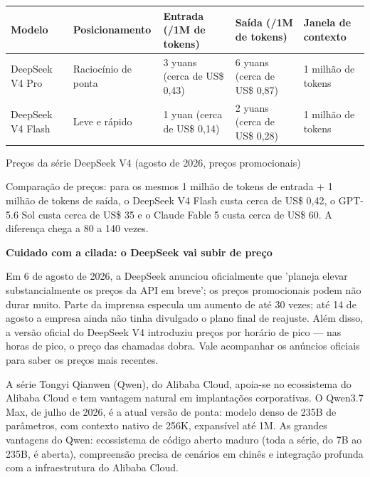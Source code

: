 \begin{center}
\begin{tabularx}{\linewidth}{|X|X|X|X|X|}
\hline
\textbf{Modelo} & \textbf{Posicionamento} & \textbf{Entrada (/1M de tokens)} & \textbf{Saída (/1M de tokens)} & \textbf{Janela de contexto} \tabularnewline
\hline
DeepSeek V4 Pro & Raciocínio de ponta & 3 yuans (cerca de US\$ 0,43) & 6 yuans (cerca de US\$ 0,87) & 1 milhão de tokens \tabularnewline
DeepSeek V4 Flash & Leve e rápido & 1 yuan (cerca de US\$ 0,14) & 2 yuans (cerca de US\$ 0,28) & 1 milhão de tokens \tabularnewline
\hline
\end{tabularx}
\end{center}

\begin{center}\small\color{gray}Preços da série DeepSeek V4 (agosto de 2026, preços promocionais)\end{center}

Comparação de preços: para os mesmos 1 milhão de tokens de entrada + 1 milhão de tokens de saída, o DeepSeek V4 Flash custa cerca de US\$ 0,42, o GPT-5.6 Sol custa cerca de US\$ 35 e o Claude Fable 5 custa cerca de US\$ 60. A diferença chega a 80 a 140 vezes.

\textbf{Cuidado com a cilada: o DeepSeek vai subir de preço}\par

Em 6 de agosto de 2026, a DeepSeek anunciou oficialmente que 'planeja elevar substancialmente os preços da API em breve'; os preços promocionais podem não durar muito. Parte da imprensa especula um aumento de até 30 vezes; até 14 de agosto a empresa ainda não tinha divulgado o plano final de reajuste. Além disso, a versão oficial do DeepSeek V4 introduziu preços por horário de pico — nas horas de pico, o preço das chamadas dobra. Vale acompanhar os anúncios oficiais para saber os preços mais recentes.


A série Tongyi Qianwen (Qwen), do Alibaba Cloud, apoia-se no ecossistema do Alibaba Cloud e tem vantagem natural em implantações corporativas. O Qwen3.7 Max, de julho de 2026, é a atual versão de ponta: modelo denso de 235B de parâmetros, com contexto nativo de 256K, expansível até 1M. As grandes vantagens do Qwen: ecossistema de código aberto maduro (toda a série, do 7B ao 235B, é aberta), compreensão precisa de cenários em chinês e integração profunda com a infraestrutura do Alibaba Cloud.

